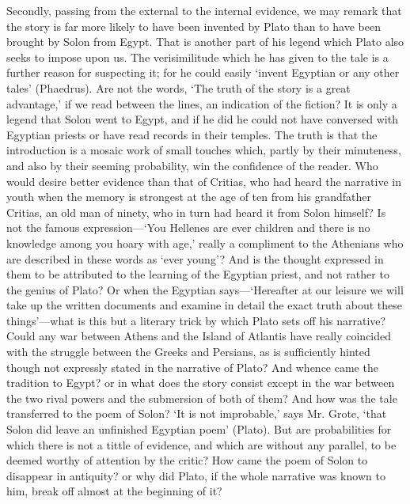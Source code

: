 Secondly, passing from the external to the internal evidence, we may
remark that the story is far more likely to have been invented by Plato
than to have been brought by Solon from Egypt. That is another part of his
legend which Plato also seeks to impose upon us. The verisimilitude which
he has given to the tale is a further reason for suspecting it; for he
could easily ‘invent Egyptian or any other tales’ (Phaedrus). Are not the
words, ‘The truth of the story is a great advantage,’ if we read between
the lines, an indication of the fiction? It is only a legend that Solon
went to Egypt, and if he did he could not have conversed with Egyptian
priests or have read records in their temples. The truth is that the
introduction is a mosaic work of small touches which, partly by their
minuteness, and also by their seeming probability, win the confidence of
the reader. Who would desire better evidence than that of Critias, who had
heard the narrative in youth when the memory is strongest at the age of
ten from his grandfather Critias, an old man of ninety, who in turn had
heard it from Solon himself? Is not the famous expression—‘You
Hellenes are ever children and there is no knowledge among you hoary with
age,’ really a compliment to the Athenians who are described in these
words as ‘ever young’? And is the thought expressed in them to be
attributed to the learning of the Egyptian priest, and not rather to the
genius of Plato? Or when the Egyptian says—‘Hereafter at our leisure
we will take up the written documents and examine in detail the exact
truth about these things’—what is this but a literary trick by which
Plato sets off his narrative? Could any war between Athens and the Island
of Atlantis have really coincided with the struggle between the Greeks and
Persians, as is sufficiently hinted though not expressly stated in the
narrative of Plato? And whence came the tradition to Egypt? or in what
does the story consist except in the war between the two rival powers and
the submersion of both of them? And how was the tale transferred to the
poem of Solon? ‘It is not improbable,’ says Mr. Grote, ‘that Solon did
leave an unfinished Egyptian poem’ (Plato). But are probabilities for
which there is not a tittle of evidence, and which are without any
parallel, to be deemed worthy of attention by the critic? How came the
poem of Solon to disappear in antiquity? or why did Plato, if the whole
narrative was known to him, break off almost at the beginning of it?

